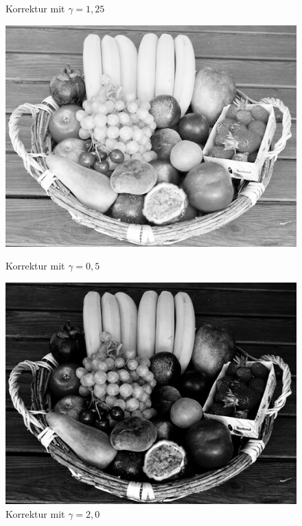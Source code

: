 \documentclass[course=erap]{aspdoc}
\begin{document}
\begin{figure}[h]
\begin{minipage}{0.49\linewidth}
			\caption{Korrektur mit $\gamma = 1,25$}
			\label{ObstkorbGamma1_25}
		\end{minipage}
		\begin{minipage}{0.49\linewidth}
			\centering
			\includegraphics[scale=1.2]{Images/fruit_basket_gamma_0,5.png}
			\caption{Korrektur mit $\gamma = 0,5$}
			\label{ObstkorbGamma0_5}
		\end{minipage}
		\centering
		\begin{minipage}{0.49\linewidth}
			\centering
			\includegraphics[scale=1.2]{Images/fruit_basket_gamma_2.png}
			\caption{Korrektur mit $\gamma = 2,0$}
			\label{ObstkorbGamma2}
		\end{minipage}
	\end{figure}
	
\end{document}
